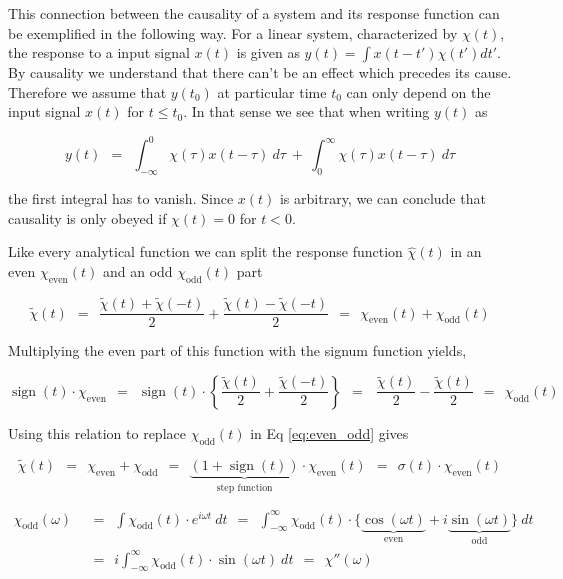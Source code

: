 \documentclass[10pt]{report}
\numberwithin{equation}{chapter}
\newcommand{\refEq}[1]{
  Eq  \ref{#1}
}
\DeclareMathOperator{\sign}{sign}
\begin{document}
This connection between the causality of a system and its response function can be exemplified in the following way.
For a linear system, characterized by $\chi(t)$, the response to a input signal $x(t)$ is given as $y(t) = \int x(t -t') \chi(t') dt'$. 
By causality we understand that there can't be an effect which precedes its cause. Therefore we assume that $y(t_0)$ at particular time $t_0$ can only depend on the input signal $x(t)$ for $t \leq t_0$. In that sense we see that when writing $y(t)$ as


\begin{equation}
  y(t) ~~=~~ \int_{-\infty}^0 \chi(\tau) x(t-\tau)\ d\tau ~+~ \int_0^\infty \chi(\tau) x(t-\tau)\ d\tau
\end{equation}

the first integral has to vanish. Since $x(t)$ is arbitrary, we can conclude that causality is only obeyed if $\chi(t)=0$ for $t<0$.

Like every analytical function we can split the response function $\hat{\chi}(t)$ in an even $\chi_\text{even}(t)$ and an odd $\chi_\text{odd}(t)$ part


\begin{equation} \label{eq:even_odd}
\tilde{\chi}(t) ~~ = ~~ \frac{\tilde{\chi}(t) + \tilde{\chi}(-t)}{2} + \frac{\tilde{\chi}(t) - \tilde{\chi}(-t)}{2} ~~ = ~~ \chi_\text{even}(t) + \chi_\text{odd}(t)
\end{equation}


Multiplying the even part of this function with the signum function yields,

\begin{equation}
  \sign(t) \cdot \chi_\text{even} ~~ = ~~ \sign(t) \cdot \left\{ \frac{\tilde{\chi}(t)}{2} + \frac{\tilde{\chi}(-t)}{2} \right\} ~~ = ~~~\frac{\tilde{\chi}(t)}{2} - \frac{\tilde{\chi}(t)}{2} ~~ = ~~ \chi_\text{odd}(t)
\end{equation}


Using this relation to replace $\chi_\text{odd}(t)$ in \refEq{eq:even_odd} gives


\begin{equation}
\tilde{\chi}(t) ~~ = ~~ \chi_\text{even} + \chi_\text{odd} ~~ = ~~ \underbrace{(1 + \sign(t))}_\text{step function} \cdot \chi_\text{even}(t) ~~ = ~~ \sigma(t) \cdot \chi_\text{even}(t)
\end{equation}


\begin{align}
  \chi_\text{odd}(\omega) ~~& =~~ \int \chi_\text{odd}(t) \cdot e^{i\omega t}\ dt
  ~~=~~ \int_{-\infty}^\infty \chi_\text{odd}(t) \cdot
  \{ \underbrace{\cos(\omega t)}_\text{even} + i\underbrace{\sin(\omega t)}_\text{odd} \}\ dt \nonumber \\
  ~~& =~~ i \int_{-\infty}^{\infty} \chi_\text{odd}(t) \cdot \sin(\omega t)\ dt ~~=~~ \chi''(\omega)
\end{align}
\end{document}
